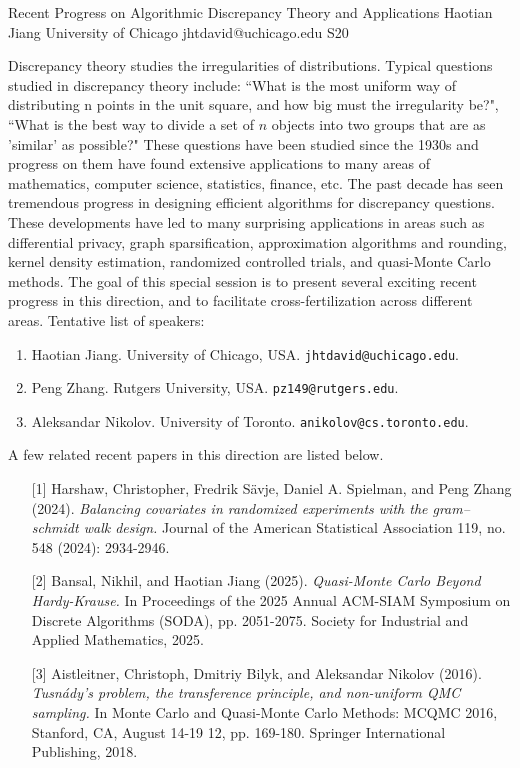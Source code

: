 

\clearpage

\begin{session}
 {Recent Progress on Algorithmic Discrepancy Theory and Applications}%
 {Haotian Jiang}%
 {University of Chicago}%
 {jhtdavid@uchicago.edu}%
{}{}{}
 {S20}%
{}

 Discrepancy theory studies the irregularities of distributions. Typical questions studied in discrepancy theory include: ``What is the most uniform way of distributing n points in the unit square, and how big must the irregularity be?", ``What is the best way to divide a set of $n$ objects into two groups that are as 'similar' as possible?" These questions have been studied since the 1930s and progress on them have found extensive applications to many areas of mathematics, computer science, statistics, finance, etc.
 The past decade has seen tremendous progress in designing efficient algorithms for discrepancy questions. These developments have led to many surprising applications in areas such as differential privacy, graph sparsification, approximation algorithms and rounding, kernel density estimation, randomized controlled trials, and quasi-Monte Carlo methods.
 The goal of this special session is to present several exciting recent progress in this direction, and to facilitate cross-fertilization across different areas. Tentative list of speakers:
 \begin{enumerate}
 \item Haotian Jiang. University of Chicago, USA. \texttt{jhtdavid@uchicago.edu}.
 \item Peng Zhang. Rutgers University, USA. \texttt{pz149@rutgers.edu}.
 \item Aleksandar Nikolov. University of Toronto. \texttt{anikolov@cs.toronto.edu}.
 \end{enumerate}
 \medskip
 A few related recent papers in this direction are listed below.
 \begin{enumerate}
 \item [{[1]}] Harshaw, Christopher, Fredrik Sävje, Daniel A. Spielman, and Peng Zhang (2024). {\it Balancing covariates in randomized experiments with the gram–schmidt walk design.} Journal of the American Statistical Association 119, no. 548 (2024): 2934-2946.
 \item[{[2]}] Bansal, Nikhil, and Haotian Jiang (2025). {\it Quasi-Monte Carlo Beyond Hardy-Krause.} In Proceedings of the 2025 Annual ACM-SIAM Symposium on Discrete Algorithms (SODA), pp. 2051-2075. Society for Industrial and Applied Mathematics, 2025.
 \item [{[3]}] Aistleitner, Christoph, Dmitriy Bilyk, and Aleksandar Nikolov (2016). {\it Tusnády’s problem, the transference principle, and non-uniform QMC sampling.} In Monte Carlo and Quasi-Monte Carlo Methods: MCQMC 2016, Stanford, CA, August 14-19 12, pp. 169-180. Springer International Publishing, 2018.
 \end{enumerate}
\end{session}

